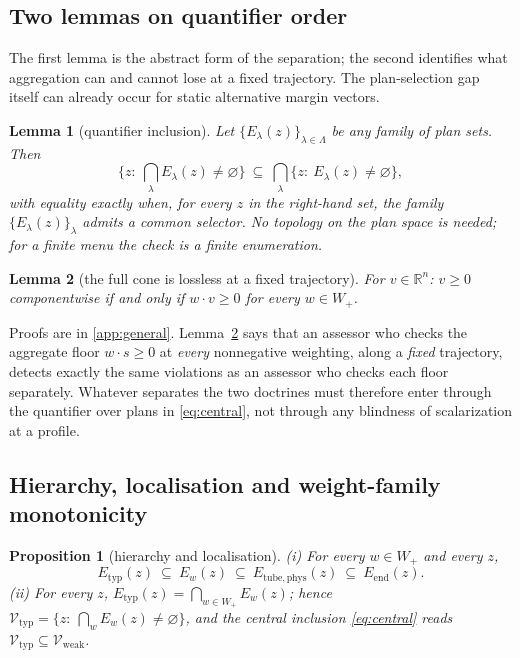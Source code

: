\documentclass[preprint,11pt,authoryear]{elsarticle}
\newtheorem{proposition}{Proposition}
\newtheorem{lemma}{Lemma}
\theoremstyle{definition}
\theoremstyle{remark}
\newcommand{\Etyp}{E_{\mathrm{typ}}}
\newcommand{\Eend}{E_{\mathrm{end}}}
\newcommand{\Ephys}{E_{\mathrm{tube,phys}}}
\newcommand{\Vtyp}{\mathcal{V}_{\mathrm{typ}}}
\newcommand{\Vweak}{\mathcal{V}_{\mathrm{weak}}}
\newcommand{\Wp}{W_+}
\begin{document}
\subsection{Two lemmas on quantifier order}

The first lemma is the abstract form of the separation; the second identifies what aggregation can and cannot lose at a fixed trajectory. The plan-selection gap itself can already occur for static alternative margin vectors.

\begin{lemma}[quantifier inclusion]\label{lem:quant}
Let $\{E_\lambda(z)\}_{\lambda\in\Lambda}$ be any family of plan sets. Then
\[
\Big\{z:\ \textstyle\bigcap_\lambda E_\lambda(z)\neq\varnothing\Big\}\ \subseteq\ \bigcap_\lambda\big\{z:\ E_\lambda(z)\neq\varnothing\big\},
\]
with equality exactly when, for every $z$ in the right-hand set, the family $\{E_\lambda(z)\}_\lambda$ admits a common selector. No topology on the plan space is needed; for a finite menu the check is a finite enumeration.
\end{lemma}

\begin{lemma}[the full cone is lossless at a fixed trajectory]\label{lem:cone}
For $v\in\mathbb R^n$: $v\ge0$ componentwise if and only if $w\cdot v\ge0$ for every $w\in\Wp$.
\end{lemma}

Proofs are in \ref{app:general}. Lemma~\ref{lem:cone} says that an assessor who checks the aggregate floor $w\cdot s\ge0$ at \emph{every} nonnegative weighting, along a \emph{fixed} trajectory, detects exactly the same violations as an assessor who checks each floor separately. Whatever separates the two doctrines must therefore enter through the quantifier over plans in \eqref{eq:central}, not through any blindness of scalarization at a profile.

\subsection{Hierarchy, localisation and weight-family monotonicity}

\begin{proposition}[hierarchy and localisation]\label{prop:hierarchy}
\textup{(i)} For every $w\in\Wp$ and every $z$,
\[
\Etyp(z)\ \subseteq\ E_w(z)\ \subseteq\ \Ephys(z)\ \subseteq\ \Eend(z).
\]
\textup{(ii)} For every $z$, $\Etyp(z)=\bigcap_{w\in\Wp}E_w(z)$; hence $\Vtyp=\{z:\ \bigcap_wE_w(z)\neq\varnothing\}$, and the central inclusion \eqref{eq:central} reads $\Vtyp\subseteq\Vweak$.
\end{proposition}
\end{document}
